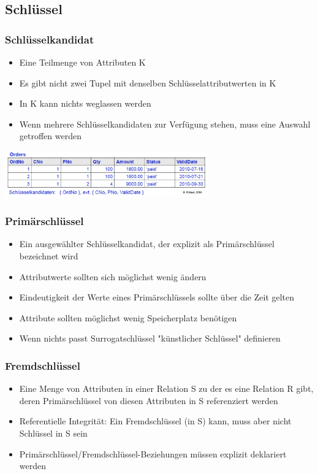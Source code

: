\documentclass[8pt,a4paper]{scrartcl}
\begin{document}
\begin{multicols*}{3}
			\subsection{Schlüssel}
				\subsubsection{Schlüsselkandidat}
					\begin{itemize}\itemsep0pt			
						\item Eine Teilmenge von Attributen K
						\item Es gibt nicht zwei Tupel mit denselben Schlüsselattributwerten in K
						\item In K kann nichts weglassen werden
						\item Wenn mehrere Schlüsselkandidaten zur Verfügung stehen, muss eine Auswahl getroffen werden
					\end{itemize}
					
					\includegraphics[height=2cm]{img/relationSchluessel.png} 			
					
				\subsubsection{Primärschlüssel}
					\begin{itemize}\itemsep0pt			
						\item Ein ausgewählter Schlüsselkandidat, der explizit als Primärschlüssel bezeichnet wird
						\item Attributwerte sollten sich möglichst wenig ändern
						\item Eindeutigkeit der Werte eines Primärschlüssels sollte über die Zeit gelten
						\item Attribute sollten möglichst wenig Speicherplatz benötigen
						\item Wenn nichts passt Surrogatschlüssel "künstlicher Schlüssel" definieren
					\end{itemize}
					
				\subsubsection{Fremdschlüssel}
					\begin{itemize}\itemsep0pt			
						\item Eine Menge von Attributen in einer Relation S zu der es eine Relation R gibt, deren Primärschlüssel von diesen Attributen in S referenziert werden
						\item Referentielle Integrität: Ein Fremdschlüssel (in S) kann, muss aber nicht Schlüssel in S sein
						\item Primärschlüssel/Fremdschlüssel-Beziehungen müssen explizit deklariert werden
					\end{itemize}		
					

\end{multicols*}
\end{document}
